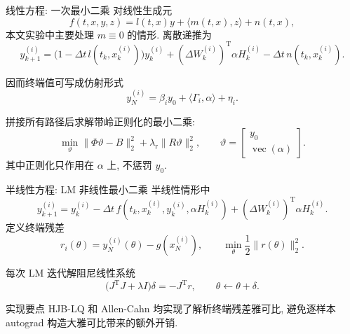 \documentclass[aspectratio=169, 10pt, fontset=fandol]{ctexbeamer}
\newcommand\T{\operatorname{T}}
\begin{document}
\begin{frame}{线性方程: 一次最小二乘}
  对线性生成元
  \begin{equation*}
    f(t,x,y,z)=l(t,x)y+\langle m(t,x),z\rangle+n(t,x),
  \end{equation*}
  本文实验中主要处理 $m\equiv 0$ 的情形. 离散递推为
  \begin{equation*}
    y_{k+1}^{(i)}
    =
    \bigl(1-\Delta t\,l(t_k,x_k^{(i)})\bigr)y_k^{(i)}
    +(\Delta W_k^{(i)})^{\T}\alpha H_k^{(i)}
    -\Delta t\,n(t_k,x_k^{(i)}).
  \end{equation*}

  因而终端值可写成仿射形式
  \begin{equation*}
    y_N^{(i)}
    =
    \beta_i y_0+\langle \Gamma_i,\alpha\rangle+\eta_i.
  \end{equation*}

  拼接所有路径后求解带岭正则化的最小二乘:
  \begin{equation*}
    \min_{\vartheta}
    \|\Phi\vartheta-B\|_2^2
    +\lambda_{\mathrm r}\|R\vartheta\|_2^2,
    \qquad
    \vartheta=\begin{bmatrix}y_0\\ \operatorname{vec}(\alpha)\end{bmatrix}.
  \end{equation*}
  其中正则化只作用在 $\alpha$ 上, 不惩罚 $y_0$.
\end{frame}

\begin{frame}{半线性方程: LM 非线性最小二乘}
  半线性情形中
  \begin{equation*}
    y_{k+1}^{(i)}
    =
    y_k^{(i)}
    -\Delta t\, f(t_k,x_k^{(i)},y_k^{(i)},\alpha H_k^{(i)})
    +(\Delta W_k^{(i)})^{\T}\alpha H_k^{(i)}.
  \end{equation*}
  定义终端残差
  \begin{equation*}
    r_i(\theta)=y_N^{(i)}(\theta)-g(x_N^{(i)}),
    \qquad
    \min_{\theta}\frac12\|r(\theta)\|_2^2.
  \end{equation*}

  每次 LM 迭代解阻尼线性系统
  \begin{equation*}
    \bigl(J^{\T}J+\lambda I\bigr)\delta=-J^{\T}r,
    \qquad
    \theta\leftarrow\theta+\delta.
  \end{equation*}

  \begin{block}{实现要点}
    HJB-LQ 和 Allen-Cahn 均实现了解析终端残差雅可比, 避免逐样本 autograd 构造大雅可比带来的额外开销.
  \end{block}
\end{frame}
\end{document}
